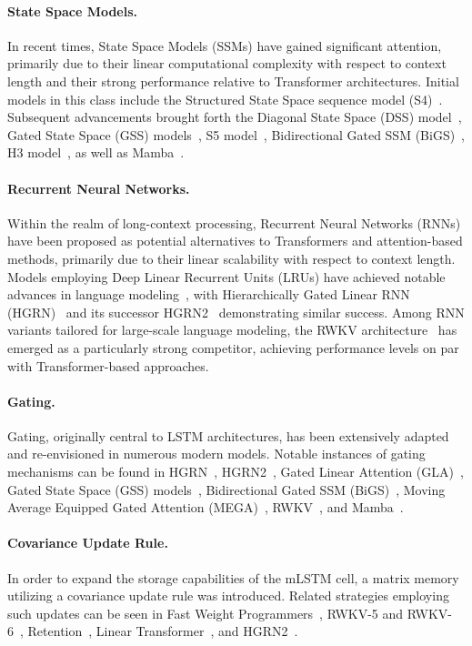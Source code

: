 \paragraph{State Space Models.} In recent times, State Space Models (SSMs) have gained significant attention, primarily due to their linear computational complexity with respect to context length and their strong performance relative to Transformer architectures. Initial models in this class include the Structured State Space sequence model (S4)~\citep{Gu:21}. Subsequent advancements brought forth the Diagonal State Space (DSS) model~\citep{Gupta:22}, Gated State Space (GSS) models~\citep{Mehta:22}, S5 model~\citep{Smith:22}, Bidirectional Gated SSM (BiGS)~\citep{Wang:22}, H3 model~\citep{Fu:23}, as well as Mamba~\citep{Gu:24arxiv}.

\paragraph{Recurrent Neural Networks.} Within the realm of long-context processing, Recurrent Neural Networks (RNNs) have been proposed as potential alternatives to Transformers and attention-based methods, primarily due to their linear scalability with respect to context length. Models employing Deep Linear Recurrent Units (LRUs) have achieved notable advances in language modeling~\citep{Orvieto:23, De:24arxiv}, with Hierarchically Gated Linear RNN (HGRN)~\citep{Qin:23} and its successor HGRN2~\citep{Qin:24arxiv} demonstrating similar success. Among RNN variants tailored for large-scale language modeling, the RWKV architecture~\citep{Peng:23arxivshort, Peng:24arxivshort} has emerged as a particularly strong competitor, achieving performance levels on par with Transformer-based approaches.

\paragraph{Gating.}
Gating, originally central to LSTM architectures, has been extensively adapted and re-envisioned in numerous modern models. Notable instances of gating mechanisms can be found in HGRN~\citep{Qin:23}, HGRN2~\citep{Qin:24arxiv}, Gated Linear Attention (GLA)~\citep{Yang:23arxiv}, Gated State Space (GSS) models~\citep{Mehta:22}, Bidirectional Gated SSM (BiGS)~\citep{Wang:22}, Moving Average Equipped Gated Attention (MEGA)~\citep{Ma:22}, RWKV~\citep{Peng:23arxivshort}, and Mamba~\citep{Gu:24arxiv}.

\paragraph{Covariance Update Rule.} 
In order to expand the storage capabilities of the mLSTM cell, a matrix memory utilizing a covariance update rule was introduced. Related strategies employing such updates can be seen in Fast Weight Programmers~\citep{Schmidhuber:92ncfastweights,Schlag:21}, RWKV-5 and RWKV-6~\citep{Peng:24arxivshort}, Retention~\citep{Sun:23arxiv}, Linear Transformer~\citep{Katharopoulos:20}, and HGRN2~\citep{Qin:24arxiv}.

